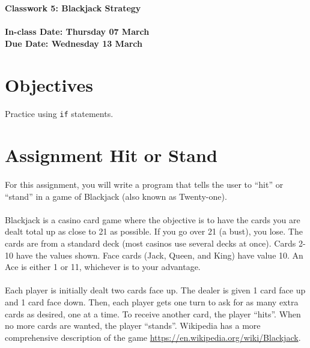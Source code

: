\documentclass[letter,11pt]{article}
\begin{document}
\huge
\textbf{Classwork 5: Blackjack Strategy}
\normalsize
\\ ~~ \\
\textbf{In-class Date: Thursday 07 March} \\
\textbf{Due Date: Wednesday 13 March}

\section*{Objectives}
\paragraph{}Practice using \texttt{if} statements.

\section*{Assignment Hit or Stand}
\paragraph{}For this assignment, you will write a program that tells the user to ``hit'' or ``stand'' in a game of Blackjack (also known as Twenty-one).
\paragraph{}Blackjack is a casino card game where the objective is to have the cards you are dealt total up as close to 21 as possible. If you go over 21 (a bust), you lose. The cards are from a standard deck (most casinos use several decks at once). Cards 2-10 have the values shown. Face cards (Jack, Queen, and King) have value 10. An Ace is either 1 or 11, whichever is to your advantage.
\paragraph{}Each player is initially dealt two cards face up. The dealer is given 1 card face up and 1 card face down. Then, each player gets one turn to ask for as many extra cards as desired, one at a time. To receive another card, the player ``hits''. When no more cards are wanted, the player ``stands''. Wikipedia has a more comprehensive description of the game \url{https://en.wikipedia.org/wiki/Blackjack}.
\end{document}
